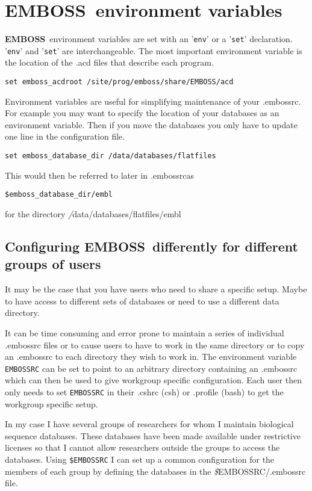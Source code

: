 \documentclass{report}
\newcommand{\ilcomm}[1]{{\tt #1}}
\newcommand{\filename}[1]{{\sf\textsl #1}}
\newcommand{\progname}[1]{{\sc #1}}
\newcommand{\EMBOSS}{{\sf\bfseries EMBOSS}}
\begin{document}
\section{\EMBOSS\ environment variables}

\EMBOSS\ environment variables are set with an '\ilcomm{env}' or a '\ilcomm{set}' declaration. '\ilcomm{env}' and '\ilcomm{set}' are interchangeable.
The most important environment variable is the location of the \filename{.acd} files that describe each program. 
\begin{verbatim}
set emboss_acdroot /site/prog/emboss/share/EMBOSS/acd
\end{verbatim}
Environment variables are useful for simplifying maintenance of your \filename{.embossrc}. For example you may want to specify the location of your databases as an environment variable. Then if you move the databases you only have to update one line in the configuration file.
\begin{verbatim}
set emboss_database_dir /data/databases/flatfiles
\end{verbatim}
This would then be referred to later in \filename{.embossrc}as
\begin{verbatim}
$emboss_database_dir/embl 
\end{verbatim}
for the directory  \filename{/data/databases/flatfiles/embl}

\subsection{Configuring \EMBOSS\ differently for different groups of users}
It may be the case that you have users who need to share a specific setup. Maybe to have access to different sets of databases  or need to use a different data directory. 

It can be time consuming and error prone to maintain a series of individual \filename{.embossrc} files or to cause users to have to work in the same directory or to copy an \filename{.embossrc} to each directory they wish to work in. 
The environment variable \ilcomm{EMBOSSRC} can be set to point to an arbitrary directory containing an  \filename{.embossrc} which can then be used to give workgroup specific configuration. Each user then only needs to set \ilcomm{EMBOSSRC} in their \filename{.cshrc} (\progname{csh}) or \filename{.profile} (\progname{bash}) to get the workgroup specific setup.

In my case I have several groups of researchers for whom I maintain biological sequence databases. These databases have been made available under restrictive licenses so that I cannot allow researchers outside the groups to access the databases. Using \ilcomm{\$EMBOSSRC} I can set up a common configuration for the members of each group by defining the databases in the \filename{\$EMBOSSRC/.embossrc} file.
\end{document}
